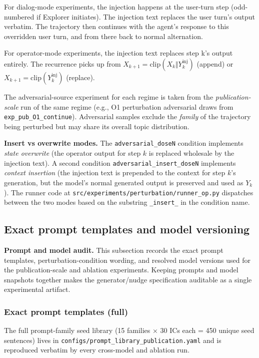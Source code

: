 \documentclass{article}
\theoremstyle{plain}
\theoremstyle{definition}
\begin{document}
For dialog-mode experiments, the injection happens at the user-turn
step (odd-numbered if Explorer initiates). The injection text replaces
the user turn's output verbatim. The trajectory then continues with
the agent's response to this overridden user turn, and from there
back to normal alternation.

For operator-mode experiments, the injection text replaces step k's
output entirely. The recurrence picks up from $X_{k+1} =
\mathrm{clip}(X_k \Vert Y_k^{\text{inj}})$ (append) or $X_{k+1} =
\mathrm{clip}(Y_k^{\text{inj}})$ (replace).

The adversarial-source experiment for each regime is taken from the
\textit{publication-scale} run of the same regime (e.g., O1 perturbation
adversarial draws from \texttt{exp\_pub\_O1\_continue}). Adversarial samples
exclude the \textit{family} of the trajectory being perturbed but may share
its overall topic distribution.

\textbf{Insert vs overwrite modes.} The \texttt{adversarial\_doseN} condition
implements \textit{state overwrite} (the operator output for step $k$ is
replaced wholesale by the injection text). A second
condition \texttt{adversarial\_insert\_doseN} implements \textit{context insertion}
(the injection text is prepended to the context for step $k$'s
generation, but the model's normal generated output is preserved
and used as $Y_k$). The runner code at \texttt{src/experiments/perturbation/runner\_op.py}
dispatches between the two modes based on the substring \texttt{\_insert\_}
in the condition name.

\subsection{Exact prompt templates and model versioning}

\textbf{Prompt and model audit.} This subsection records the exact prompt templates, perturbation-condition wording, and resolved model versions used for the publication-scale and ablation experiments. Keeping prompts and model snapshots together makes the generator/nudge specification auditable as a single experimental artifact.

\subsubsection*{Exact prompt templates (full)}

The full prompt-family seed library (15 families × 30 ICs each = 450
unique seed sentences) lives in \texttt{configs/prompt\_library\_publication.yaml}
and is reproduced verbatim by every cross-model and ablation run.
\end{document}
